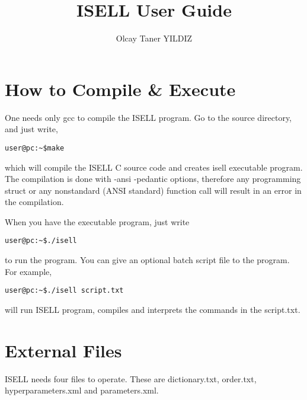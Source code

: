 \documentclass[a4paper,12pt]{book}
\title{ISELL User Guide}
\author{Olcay Taner YILDIZ}
\begin{document}
\maketitle
\tableofcontents

\chapter{How to Compile \& Execute}
One needs only gcc to compile the ISELL program. Go to the source directory, and just write,
\begin{verbatim}
user@pc:~$make
\end{verbatim}
which will compile the ISELL C source code and creates isell executable program. The compilation is done with -ansi -pedantic options, therefore any programming struct or any nonstandard (ANSI standard) function call will result in an error in the compilation.

When you have the executable program, just write
\begin{verbatim}
user@pc:~$./isell
\end{verbatim}
to run the program. You can give an optional batch script file to the program. For example,
\begin{verbatim}
user@pc:~$./isell script.txt
\end{verbatim}
will run ISELL program, compiles and interprets the commands in the script.txt.

\chapter{External Files}
ISELL needs four files to operate. These are dictionary.txt, order.txt, hyperparameters.xml and parameters.xml.
\end{document}
